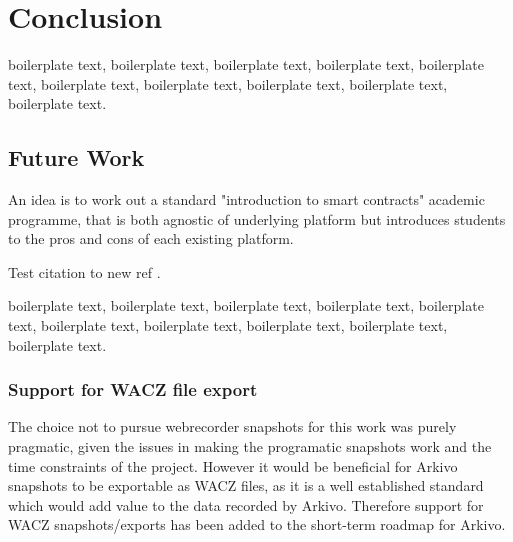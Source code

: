 \chapter{Conclusion}


boilerplate text, boilerplate text, boilerplate text, boilerplate text, boilerplate text, boilerplate text, boilerplate text, boilerplate text, boilerplate text, boilerplate text.


\section{Future Work}


An idea is to work out a standard "introduction to smart contracts" academic programme, that is both agnostic of underlying platform but introduces students to the pros and cons of each existing platform.

Test citation to new ref  \cite{dekkerCollectingConservingNet2018}.

boilerplate text, boilerplate text, boilerplate text, boilerplate text, boilerplate text, boilerplate text, boilerplate text, boilerplate text, boilerplate text, boilerplate text.

\subsection{Support for WACZ file export}

The choice not to pursue webrecorder snapshots for this work was purely pragmatic, given the issues in making the programatic snapshots work and the time constraints of the project. However it would be beneficial for Arkivo snapshots to be exportable as WACZ files, as it is a well established standard which would add value to the data recorded by Arkivo. Therefore support for WACZ snapshots/exports has been added to the short-term roadmap for Arkivo.